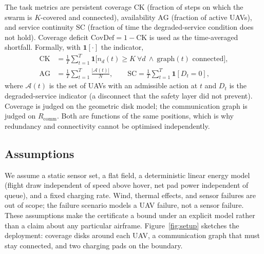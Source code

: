 \documentclass[conference]{IEEEtran}
\newcommand{\ck}{\mathrm{CK}}
\begin{document}
The task metrics are persistent coverage $\ck$ (fraction of steps on which the swarm is $K$-covered and connected), availability $\mathrm{AG}$ (fraction of active UAVs), and service continuity $\mathrm{SC}$ (fraction of time the degraded-service condition does not hold). Coverage deficit $\mathrm{CovDef}=1-\ck$ is used as the time-averaged shortfall. Formally, with $\mathbf{1}[\cdot]$ the indicator,
\begin{align}
\ck &= \frac{1}{T}\sum_{t=1}^{T}\mathbf{1}\big[n_d(t)\ge K\ \forall d\ \wedge\ \text{graph}(t)\text{ connected}\big],\\
\mathrm{AG} &= \frac{1}{T}\sum_{t=1}^{T}\frac{|\mathcal{A}(t)|}{N},\qquad
\mathrm{SC} = \frac{1}{T}\sum_{t=1}^{T}\mathbf{1}[D_t=0],
\end{align}
where $\mathcal{A}(t)$ is the set of UAVs with an admissible action at $t$ and $D_t$ is the degraded-service indicator (a disconnect that the safety layer did not prevent). Coverage is judged on the geometric disk model; the communication graph is judged on $R_{\mathrm{comm}}$. Both are functions of the same positions, which is why redundancy and connectivity cannot be optimised independently.

\subsection{Assumptions}
We assume a static sensor set, a flat field, a deterministic linear energy model (flight draw independent of speed above hover, net pad power independent of queue), and a fixed charging rate. Wind, thermal effects, and sensor failures are out of scope; the failure scenario models a UAV failure, not a sensor failure. These assumptions make the certificate a bound under an explicit model rather than a claim about any particular airframe. Figure~\ref{fig:setup} sketches the deployment: coverage disks around each UAV, a communication graph that must stay connected, and two charging pads on the boundary.
\end{document}
